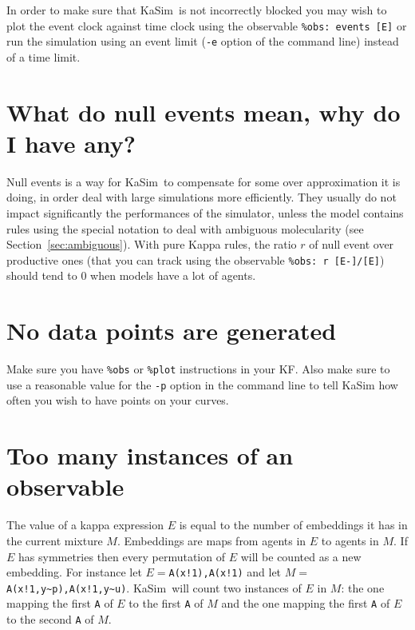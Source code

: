\documentclass[11pt]{book}
\def\KaSim{\textsf{KaSim}}
\def\intstate{\textasciitilde}
\def\ttt#1{\texttt{#1}}
\begin{document}
In order to make sure that \KaSim~is not incorrectly blocked you may wish to plot the event clock against time clock using the observable \ttt{\%obs: {\textquotesingle}events{\textquotesingle} [E]} or run the simulation using an event limit (\ttt{-e} option of the command line) instead of a time limit.

\section*{What do null events mean, why do I have any?}

Null events is a way for \KaSim~to compensate for some over approximation it is doing, in order deal with large simulations more efficiently. They usually do not impact significantly the performances of the simulator, unless the model contains rules using the special notation to deal with ambiguous molecularity (see Section~\ref{sec:ambiguous}). With pure Kappa rules, the ratio $r$ of null event over productive ones (that you can track using the observable \ttt{\%obs: {\textquotesingle}r{\textquotesingle}  [E-]/[E]}) should tend to 0 when models have a lot of agents.

\section*{No data points are generated}
Make sure you have \ttt{\%obs} or \ttt{\%plot} instructions in your KF. Also make sure to use a reasonable value for the \ttt{-p} option in the command line to tell KaSim how often you wish to have points on your curves.

\section*{Too many instances of an observable}
The value of a kappa expression $E$  is equal to the number of embeddings it has in the current mixture $M$. Embeddings are maps from agents in $E$  to agents in $M$. If $E$ has symmetries then every permutation of $E$ will be counted as a new embedding. For instance let $E=$\ttt{A(x!1),A(x!1)}  and let $M=$\ttt{A(x!1,y\intstate p),A(x!1,y\intstate u)}.
\KaSim~will count two instances of $E$ in $M$: the one mapping the first \ttt{A} of $E$ to the first \ttt{A} of $M$ and the one mapping the first \ttt{A} of $E$ to the second \ttt{A} of $M$.
\end{document}
